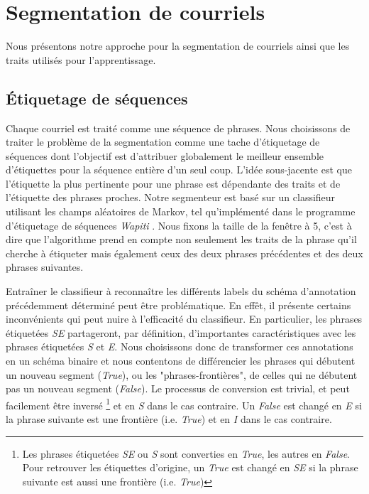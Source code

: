 
\chapter{Segmentation de courriels}

\label{ch:methodology_for_email_segmentation}

Nous présentons notre approche pour la segmentation de courriels ainsi que les traits utilisés pour l'apprentissage.

\section{Étiquetage de séquences}

Chaque courriel est traité comme une séquence de phrases. Nous choisissons de traiter le problème de la segmentation comme une tache d'étiquetage de séquences dont l'objectif est d'attribuer globalement le meilleur ensemble d'étiquettes pour la séquence entière d'un seul coup. L'idée sous-jacente est que l'étiquette la plus pertinente pour une phrase est dépendante des traits et de l'étiquette des phrases proches. Notre segmenteur est basé sur un classifieur utilisant les champs aléatoires de Markov, tel qu'implémenté dans le programme d'étiquetage de séquences \textit{Wapiti} \cite{lavergne2010practical}. Nous fixons la taille de la fenêtre à 5, c'est à dire que l'algorithme prend en compte non seulement les traits de la phrase qu'il cherche à étiqueter mais également ceux des deux phrases précédentes et des deux phrases suivantes.

Entraîner le classifieur à reconnaître les différents labels du schéma d'annotation précédemment déterminé peut être problématique. En effêt, il présente certains inconvénients qui peut nuire à l'efficacité du classifieur. En particulier, les phrases étiquetées \textit{SE} partageront, par définition, d'importantes caractéristiques avec les phrases étiquetées \textit{S} et \textit{E}. Nous choisissons donc de transformer ces annotations en un schéma binaire et nous contentons de différencier les phrases qui débutent un nouveau segment (\textit{True}), ou les "phrases-frontières", de celles qui ne débutent pas un nouveau segment (\textit{False}). Le processus de conversion est trivial, et peut facilement être inversé \footnote{Les phrases étiquetées \textit{SE} ou \textit{S} sont converties en \textit{True}, les autres en \textit{False}. Pour retrouver les étiquettes d'origine, un \textit{True} est changé en \textit{SE} si la phrase suivante est aussi une frontière (i.e. \textit{True})} et en \textit{S} dans le cas contraire. Un \textit{False} est changé en \textit{E} si la phrase suivante est une frontière (i.e. \textit{True}) et en \textit{I} dans le cas contraire.

